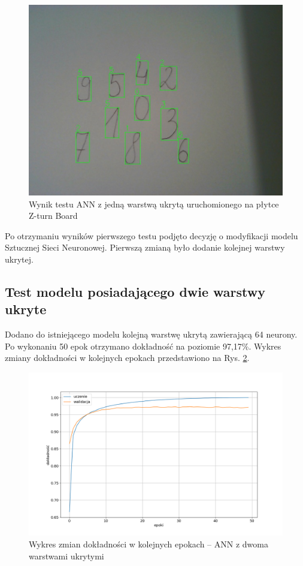 \begin{figure}[!h]
    \centering
    \includegraphics[width=\textwidth]{img/1hid-layer-zturn-img.jpg}
    \caption{Wynik testu ANN z jedną warstwą ukrytą uruchomionego na płytce Z-turn Board}
    \label{1hid-layer-zturn-img}
\end{figure}

Po otrzymaniu wyników pierwszego testu podjęto decyzję o modyfikacji modelu Sztucznej Sieci 
Neuronowej. Pierwszą zmianą było dodanie kolejnej warstwy ukrytej.

\subsection{Test modelu posiadającego dwie warstwy ukryte}

Dodano do istniejącego modelu kolejną warstwę ukrytą zawierającą 64 neurony. Po wykonaniu 50 epok 
otrzymano dokładność na poziomie 97,17\%. Wykres zmiany dokładności w kolejnych epokach 
przedstawiono na Rys. \ref{keras-accuracy2}.

\begin{figure}
    \centering
    \includegraphics[width=\textwidth]{img/keras-accuracy2.png}
    \caption{Wykres zmian dokładności w kolejnych epokach -- ANN z dwoma warstwami ukrytymi}
    \label{keras-accuracy2}
\end{figure}


